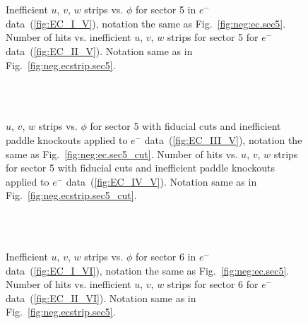 \begin{figure}[!ht]
  \centering
   \quad
  \\
   \\

      \caption {Inefficient  $u$, $v$, $w$ strips vs. $\phi$ for sector 5 in  $e^{-} \ $ data~(\ref{fig:EC_I_V}), notation the same as Fig.~\ref{fig:neg:ec.sec5}. Number of hits vs. inefficient  $u$, $v$, $w$ strips for sector 5 for $e^-$ data~(\ref{fig:EC_II_V}). Notation same as in Fig.~\ref{fig:neg.ecstrip.sec5}.}
        \label{fig:EC_no_V}
\end{figure}



\begin{figure}[!ht]
  \centering
   \quad
  \\
   \\

      \caption { $u$, $v$, $w$ strips vs. $\phi$ for sector 5 with fiducial cuts and inefficient paddle knockouts applied to $e^-$ data~(\ref{fig:EC_III_V}), notation the same as Fig.~\ref{fig:neg:ec.sec5_cut}. Number of hits vs.  $u$, $v$, $w$ strips for sector 5 with fiducial cuts and inefficient paddle knockouts applied to $e^-$ data~(\ref{fig:EC_IV_V}). Notation same as in Fig.~\ref{fig:neg.ecstrip.sec5_cut}.}
        \label{fig:EC_cut_V}
\end{figure}

\begin{figure}[!ht]
  \centering
   \quad
  \\
   \\

      \caption {Inefficient  $u$, $v$, $w$ strips vs. $\phi$ for sector 6 in  $e^{-} \ $ data~(\ref{fig:EC_I_VI}), notation the same as Fig.~\ref{fig:neg:ec.sec5}. Number of hits vs. inefficient  $u$, $v$, $w$ strips for sector 6 for $e^-$ data~(\ref{fig:EC_II_VI}). Notation same as in Fig.~\ref{fig:neg.ecstrip.sec5}.}
        \label{fig:EC_no_VI}
\end{figure}



